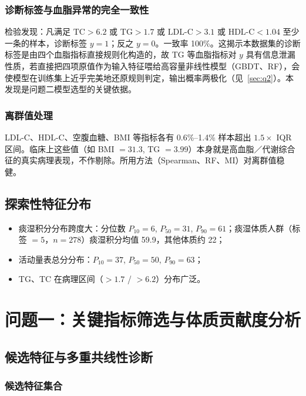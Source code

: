 \documentclass{MathorCupmodeling}
\providecommand{\tightlist}{%
  \setlength{\itemsep}{0pt}\setlength{\parskip}{0pt}}
\begin{document}
\subsubsection{诊断标签与血脂异常的完全一致性}

检验发现：凡满足 $\text{TC}>6.2$ 或 $\text{TG}>1.7$ 或 $\text{LDL-C}>3.1$ 或 $\text{HDL-C}<1.04$ 至少一条的样本，诊断标签 $y=1$；反之 $y=0$。一致率 100\%。这揭示本数据集的诊断标签是由四个血脂指标直接规则化构造的，故 TG 等血脂指标对 $y$ 具有信息泄漏性质，若直接把四项原值作为输入特征喂给高容量非线性模型（GBDT、RF），会使模型在训练集上近乎完美地还原规则判定，输出概率两极化（见~\cref{sec:q2}）。本发现是问题二模型选型的关键依据。

\subsubsection{离群值处理}

LDL-C、HDL-C、空腹血糖、BMI 等指标各有 0.6\%--1.4\% 样本超出 $1.5\times$ IQR 区间。临床上这些值（如 BMI $=31.3$, TG $=3.99$）本身就是高血脂／代谢综合征的真实病理表现，不作剔除。所用方法（Spearman、RF、MI）对离群值稳健。

\subsection{探索性特征分布}

\begin{itemize}
\tightlist
\item 痰湿积分分布跨度大：分位数 $P_{10}=6$, $P_{50}=31$, $P_{90}=61$；痰湿体质人群（标签 $=5$，$n=278$）痰湿积分均值 59.9，其他体质约 22；
\item 活动量表总分分布：$P_{10}=37$, $P_{50}=50$, $P_{90}=63$；
\item TG、TC 在病理区间（$>1.7$ / $>6.2$）分布广泛。
\end{itemize}

\section{问题一：关键指标筛选与体质贡献度分析}\label{sec:q1}

\subsection{候选特征与多重共线性诊断}

\subsubsection{候选特征集合}
\end{document}

